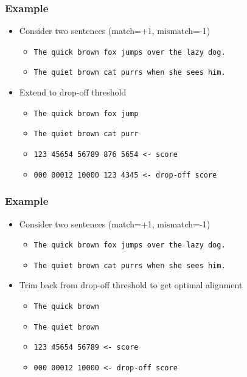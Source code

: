 \documentclass[table]{beamer}
\begin{document}
  \begin{frame}
    \frametitle{Example}
    \begin{itemize}
      \item Consider two sentences (match=+1, mismatch=-1)
      \begin{itemize}
        \item \texttt{The quick brown fox jumps over the lazy dog.}
        \item \texttt{The quiet brown cat purrs when she sees him.}
      \end{itemize}
      \item Extend to drop-off threshold
      \begin{itemize}
        \item \texttt{The quick brown fox jump}
        \item \texttt{The quiet brown cat purr}
        \item \texttt{123 45654 56789 876 5654 <- score}
        \item \texttt{000 00012 10000 123 4345 <- drop-off score}        
      \end{itemize}
    \end{itemize}
  \end{frame}

  \begin{frame}
    \frametitle{Example}
    \begin{itemize}
      \item Consider two sentences (match=+1, mismatch=-1)
      \begin{itemize}
        \item \texttt{The quick brown fox jumps over the lazy dog.}
        \item \texttt{The quiet brown cat purrs when she sees him.}
      \end{itemize}
      \item Trim back from drop-off threshold to get optimal alignment
      \begin{itemize}
        \item \texttt{The quick brown}
        \item \texttt{The quiet brown}
        \item \texttt{123 45654 56789 <- score}
        \item \texttt{000 00012 10000 <- drop-off score}        
      \end{itemize}
    \end{itemize}
  \end{frame}
\end{document}
